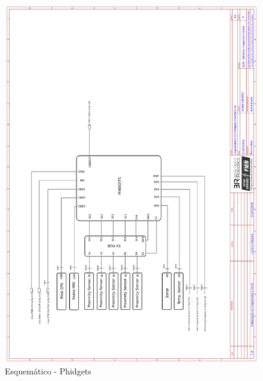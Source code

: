     
    \begin{figure}[h]
	\centering
	\includegraphics[width=14cm]{Figures/EsquematicoPHIDGETS.png}
	\caption{Esquemático - Phidgets} \label{Phidgets}
	\end{figure}
	
    \pagebreak

